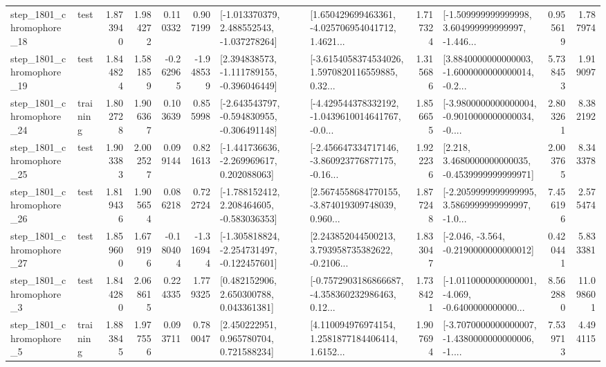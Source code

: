 \begin{tabular}{llrrrrllrlrr}
 step\_1801\_chromophore\_18 &      test &      1.873940 &    1.984272 &      0.110332 &  0.907199 &   [-1.013370379, 2.488552543, -1.037278264] &  [1.650429699463361, -4.025706954041712, 1.4621... &       1.717324 &  [-1.509999999999998, 3.604999999999997, -1.446... &            0.955619 &          1.787974 \\
 step\_1801\_chromophore\_19 &      test &      1.844824 &    1.581859 &     -0.262965 & -1.948539 &   [2.394838573, -1.111789155, -0.396046449] &  [-3.6154058374534026, 1.5970820116559885, 0.32... &       1.315686 &  [3.8840000000000003, -1.6000000000000014, -0.2... &            5.738453 &          1.919097 \\
 step\_1801\_chromophore\_24 &  training &      1.802728 &    1.906367 &      0.103639 &  0.855998 &  [-2.643543797, -0.594830955, -0.306491148] &  [-4.429544378332192, -1.0439610014641767, -0.0... &       1.856655 &  [-3.9800000000000004, -0.9010000000000034, -0.... &            2.803261 &          8.382192 \\
 step\_1801\_chromophore\_25 &      test &      1.903383 &    2.002527 &      0.099144 &  0.821613 &   [-1.441736636, -2.269969617, 0.202088063] &  [-2.456647334717146, -3.860923776877175, -0.16... &       1.922236 &   [2.218, 3.4680000000000035, -0.4539999999999971] &            2.003765 &          8.343378 \\
 step\_1801\_chromophore\_26 &      test &      1.819436 &    1.905654 &      0.086218 &  0.722724 &   [-1.788152412, 2.208464605, -0.583036353] &  [2.5674558684770155, -3.874019309748039, 0.960... &       1.877248 &  [-2.2059999999999995, 3.5869999999999997, -1.0... &            7.456196 &          2.575474 \\
 step\_1801\_chromophore\_27 &      test &      1.859600 &    1.679196 &     -0.180404 & -1.316944 &  [-1.305818824, -2.254731497, -0.122457601] &  [2.243852044500213, 3.793958735382622, -0.2106... &       1.833047 &              [-2.046, -3.564, -0.2190000000000012] &            0.420441 &          5.833381 \\
  step\_1801\_chromophore\_3 &      test &      1.844280 &    2.068615 &      0.224335 &  1.779325 &     [0.482152906, 2.650300788, 0.043361381] &  [-0.7572903186866687, -4.358360232986463, 0.12... &       1.738421 &  [-1.0110000000000001, -4.069, -0.6400000000000... &            8.562880 &         11.098601 \\
  step\_1801\_chromophore\_5 &  training &      1.883845 &    1.977556 &      0.093711 &  0.780047 &     [2.450222951, 0.965780704, 0.721588234] &  [4.110094976974154, 1.2581877184406414, 1.6152... &       1.907694 &  [-3.7070000000000007, -1.4380000000000006, -1.... &            7.539713 &          4.494115 \\

\end{tabular}
